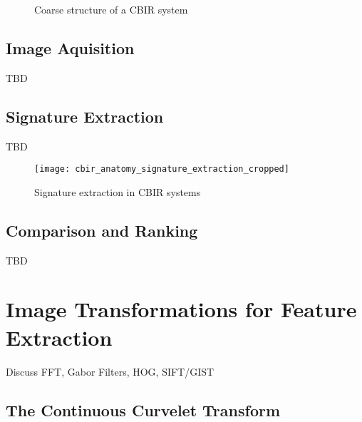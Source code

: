 \begin{figure}[h]
    \centering
    \quad
    \caption{Coarse structure of a CBIR system}
    \label{fig:cbir_coarse_structure}
\end{figure}

\subsection{Image Aquisition}

TBD

\subsection{Signature Extraction}

TBD

\begin{figure}[h]
    \centering
        \texttt{[image: cbir\_anatomy\_signature\_extraction\_cropped]}
    \caption{Signature extraction in CBIR systems}
    \label{fig:cbir_signature_extraction}
\end{figure}

\subsection{Comparison and Ranking}

TBD

\section{Image Transformations for Feature Extraction}

Discuss FFT, Gabor Filters, HOG, SIFT/GIST

\subsection{The Continuous Curvelet Transform}

